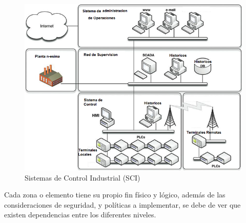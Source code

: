\documentclass[jou,apacite]{apa6}   %
\begin{document}
\begin{figure}[htb]
\centering
\includegraphics[scale=0.5]{images/sci.png}
\caption{Sistemas de Control Industrial (SCI)} \label{fig:sci}
\end{figure}
Cada zona o elemento tiene su propio fin físico y lógico, además de las consideraciones de seguridad, y políticas a implementar, se debe de ver que  existen dependencias entre los diferentes niveles. 
\end{document}
